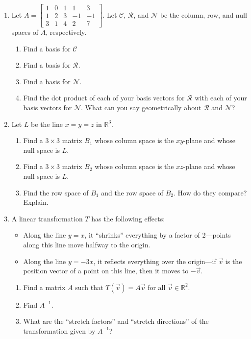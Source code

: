 \documentclass[letter]{article}
\newcommand{\R}{\mathbb{R}}
\newcommand{\mat}[1]{\begin{bmatrix}#1\end{bmatrix}}
\begin{document}
\begin{enumerate}
		\item Let $A = \mat{1 & 0 & 1 & 1 & 3 \\ 1 & 2 & 3 & -1 & -1 \\ 3 & 1 & 4 & 2 & 7}$.  Let $\mathcal{C}$, $\mathcal{R}$, and $\mathcal{N}$ be the column, row, and null spaces of $A$, respectively.
		\begin{enumerate}
			\item Find a basis for $\mathcal{C}$
			\item Find a basis for $\mathcal{R}$.
			\item Find a basis for $\mathcal{N}$.
			\item Find the dot product of each of your basis vectors for $\mathcal{R}$ with each of your basis vectors for $\mathcal{N}$.
			What can you say geometrically about $\mathcal{R}$ and $\mathcal{N}$?
		\end{enumerate}
		
		\item Let $L$ be the line $x=y=z$ in $\R^3$.
		\begin{enumerate}
			\item Find a $3\times 3$ matrix $B_1$ whose column space is the $xy$-plane and whose null space is $L$.
			\item Find a $3\times 3$ matrix $B_2$ whose column space is the $xz$-plane and whose null space is $L$.
			\item Find the row space of $B_1$ and the row space of $B_2$.  How do they compare?  Explain.
		\end{enumerate}
		
		\item A linear transformation $T$ has the following effects:
		\begin{itemize}
			\item Along the line $y = x$, it ``shrinks'' everything by a factor of 2---points along this line move halfway to the origin.
			\item Along the line $y=-3x$, it reflects everything over the origin---if $\vec{v}$ is the position vector of a point on this line, then it moves to $-\vec{v}$.
		\end{itemize}
		\begin{enumerate}
			\item Find a matrix $A$ such that $T(\vec{v}) = A\vec{v}$ for all $\vec{v} \in \R^2$.
			\item Find $A^{-1}$.
			\item What are the ``stretch factors'' and ``stretch directions'' of the transformation given by $A^{-1}$?
		\end{enumerate}


\end{enumerate}
\end{document}
